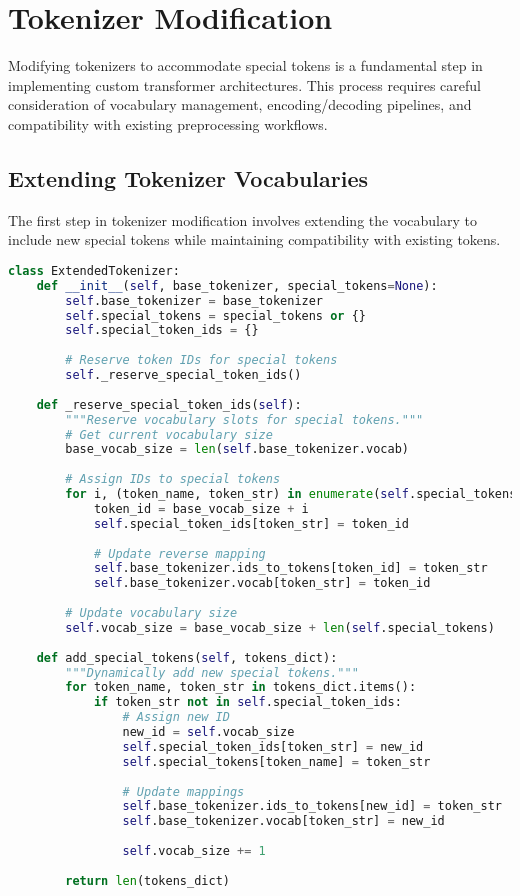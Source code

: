 
\section{Tokenizer Modification}

Modifying tokenizers to accommodate special tokens is a fundamental step in implementing custom transformer architectures. This process requires careful consideration of vocabulary management, encoding/decoding pipelines, and compatibility with existing preprocessing workflows.

\subsection{Extending Tokenizer Vocabularies}

The first step in tokenizer modification involves extending the vocabulary to include new special tokens while maintaining compatibility with existing tokens.

\begin{lstlisting}[language=Python, caption=Safe vocabulary extension for special tokens]
class ExtendedTokenizer:
    def __init__(self, base_tokenizer, special_tokens=None):
        self.base_tokenizer = base_tokenizer
        self.special_tokens = special_tokens or {}
        self.special_token_ids = {}
        
        # Reserve token IDs for special tokens
        self._reserve_special_token_ids()
        
    def _reserve_special_token_ids(self):
        """Reserve vocabulary slots for special tokens."""
        # Get current vocabulary size
        base_vocab_size = len(self.base_tokenizer.vocab)
        
        # Assign IDs to special tokens
        for i, (token_name, token_str) in enumerate(self.special_tokens.items()):
            token_id = base_vocab_size + i
            self.special_token_ids[token_str] = token_id
            
            # Update reverse mapping
            self.base_tokenizer.ids_to_tokens[token_id] = token_str
            self.base_tokenizer.vocab[token_str] = token_id
            
        # Update vocabulary size
        self.vocab_size = base_vocab_size + len(self.special_tokens)
        
    def add_special_tokens(self, tokens_dict):
        """Dynamically add new special tokens."""
        for token_name, token_str in tokens_dict.items():
            if token_str not in self.special_token_ids:
                # Assign new ID
                new_id = self.vocab_size
                self.special_token_ids[token_str] = new_id
                self.special_tokens[token_name] = token_str
                
                # Update mappings
                self.base_tokenizer.ids_to_tokens[new_id] = token_str
                self.base_tokenizer.vocab[token_str] = new_id
                
                self.vocab_size += 1
                
        return len(tokens_dict)
\end{lstlisting}

